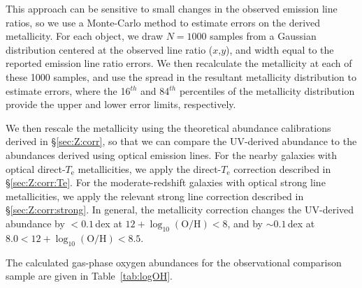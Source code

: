 \documentclass[preprint2]{aastex62}
\newcommand{\logten}{\ensuremath{\log_{10}}}
\newcommand{\logOH}{\ensuremath{\logten (\mathrm{O}/\mathrm{H})}\xspace}
\newcommand{\Te}{\ensuremath{T_{\mathrm{e}}}\xspace}
\begin{document}
This approach can be sensitive to small changes in the observed emission line ratios, so we use a Monte-Carlo method to estimate errors on the derived metallicity. For each object, we draw $N=1000$ samples from a Gaussian distribution centered at the observed line ratio ($x$,$y$), and width equal to the reported emission line ratio errors. We then recalculate the metallicity at each of these 1000 samples, and use the spread in the resultant metallicity distribution to estimate errors, where the 16$^{th}$ and 84$^{th}$ percentiles of the metallicity distribution provide the upper and lower error limits, respectively.

We then rescale the metallicity using the theoretical abundance calibrations derived in \S\ref{sec:Z:corr}, so that we can compare the UV-derived abundance to the abundances derived using optical emission lines. For the nearby galaxies with optical direct-\Te metallicities, we apply the direct-\Te correction described in \S\ref{sec:Z:corr:Te}. For the moderate-redshift galaxies with optical strong line metallicities, we apply the relevant strong line correction described in \S\ref{sec:Z:corr:strong}. In general, the metallicity correction changes the UV-derived abundance by $<0.1$\,dex at $12 + \logOH < 8$, and by ${\sim}0.1$\,dex at $8.0 < 12 + \logOH < 8.5$.

The calculated gas-phase oxygen abundances for the observational comparison sample are given in Table~\ref{tab:logOH}.
\end{document}
